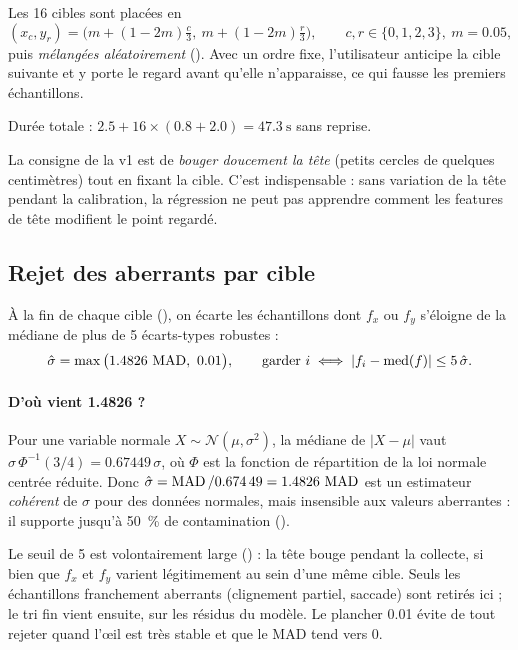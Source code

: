 Les 16 cibles sont placées en
\begin{equation}
  (x_c, y_r) = \Big(m + (1-2m)\tfrac{c}{3},\ m + (1-2m)\tfrac{r}{3}\Big), \qquad c, r \in \{0,1,2,3\},\ m = \num{0.05},
\end{equation}
puis \emph{mélangées aléatoirement} (). Avec un ordre fixe, l'utilisateur anticipe la cible suivante et y porte le regard avant qu'elle n'apparaisse, ce qui fausse les premiers échantillons.

Durée totale : $\num{2.5} + 16 \times (\num{0.8} + \num{2.0}) = \qty{47.3}{\second}$ sans reprise.

La consigne de la v1 est de \emph{bouger doucement la tête} (petits cercles de quelques centimètres) tout en fixant la cible. C'est indispensable : sans variation de la tête pendant la calibration, la régression ne peut pas apprendre comment les features de tête modifient le point regardé.

\subsection{Rejet des aberrants par cible}

À la fin de chaque cible (), on écarte les échantillons dont $f_x$ ou $f_y$ s'éloigne de la médiane de plus de 5 écarts-types robustes :
\begin{equation}
  \hat\sigma = \max\big(\num{1.4826}\,\MAD,\ \num{0.01}\big), \qquad \text{garder } i \iff |f_i - \med(f)| \leq 5\,\hat\sigma .
\end{equation}

\paragraph{D'où vient \num{1.4826} ?} Pour une variable normale $X \sim \mathcal N(\mu, \sigma^2)$, la médiane de $|X - \mu|$ vaut $\sigma\,\Phi^{-1}(3/4) = \num{0.67449}\,\sigma$, où $\Phi$ est la fonction de répartition de la loi normale centrée réduite. Donc $\hat\sigma = \operatorname{MAD} / \num{0.67449} = \num{1.4826}\,\operatorname{MAD}$ est un estimateur \emph{cohérent} de $\sigma$ pour des données normales, mais insensible aux valeurs aberrantes : il supporte jusqu'à \qty{50}{\percent} de contamination \cite{rousseeuw1993} (\deriv).

Le seuil de 5 est volontairement large (\empi) : la tête bouge pendant la collecte, si bien que $f_x$ et $f_y$ varient légitimement au sein d'une même cible. Seuls les échantillons franchement aberrants (clignement partiel, saccade) sont retirés ici ; le tri fin vient ensuite, sur les résidus du modèle. Le plancher \num{0.01} évite de tout rejeter quand l'œil est très stable et que le MAD tend vers 0.

